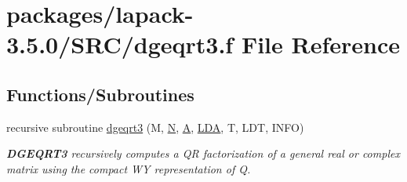 \hypertarget{dgeqrt3_8f}{}\section{packages/lapack-\/3.5.0/\+S\+R\+C/dgeqrt3.f File Reference}
\label{dgeqrt3_8f}
\subsection*{Functions/\+Subroutines}
\begin{DoxyCompactItemize}
\item 
recursive subroutine \hyperlink{group__doubleGEcomputational_ga3ad112f2b0890b3815e696628906f30c}{dgeqrt3} (M, \hyperlink{polmisc_8c_a0240ac851181b84ac374872dc5434ee4}{N}, \hyperlink{classA}{A}, \hyperlink{example__user_8c_ae946da542ce0db94dced19b2ecefd1aa}{L\+D\+A}, T, L\+D\+T, I\+N\+F\+O)
\begin{DoxyCompactList}\small\item\em {\bfseries D\+G\+E\+Q\+R\+T3} recursively computes a Q\+R factorization of a general real or complex matrix using the compact W\+Y representation of Q. \end{DoxyCompactList}\end{DoxyCompactItemize}
